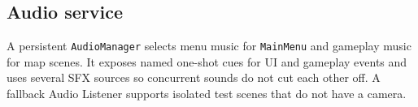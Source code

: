 \subsection{Audio service}
A persistent \texttt{AudioManager} selects menu music for \texttt{MainMenu} and gameplay music for map scenes. It exposes named one-shot cues for UI and gameplay events and uses several SFX sources so concurrent sounds do not cut each other off. A fallback Audio Listener supports isolated test scenes that do not have a camera.
